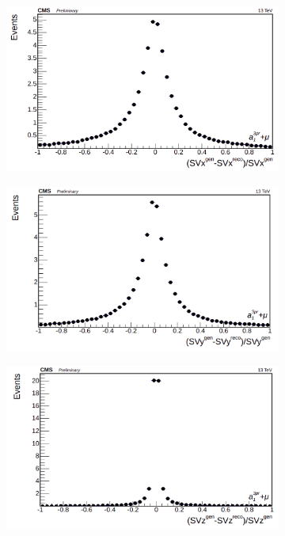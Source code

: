 \begin{figure}
    \begin{subfigure}[b]{0.5\linewidth}
    \centering
    \includegraphics[scale=0.19]{Chapitre6/Images/SVx.png} 
    \caption*{} 
  \end{subfigure}%
  \begin{subfigure}[b]{0.5\linewidth}
    \centering
    \includegraphics[scale=0.19]{Chapitre6/Images/SVy.png} 
    \caption*{} 
  \end{subfigure}
  
  \begin{subfigure}[b]{\linewidth}
    \centering
    \includegraphics[scale=0.19]{Chapitre6/Images/SVz.png} 
    \caption*{} 
  \end{subfigure}


\end{figure}
